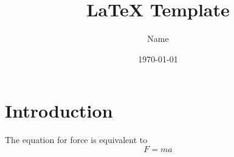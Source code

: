 \documentclass{article}
\title{\vspace{-2cm}LaTeX Template}
\author{Name}
\date{\today}
\begin{document}
\maketitle

\section{Introduction}
The equation for force is equivalent to $$F=ma$$
\end{document}
